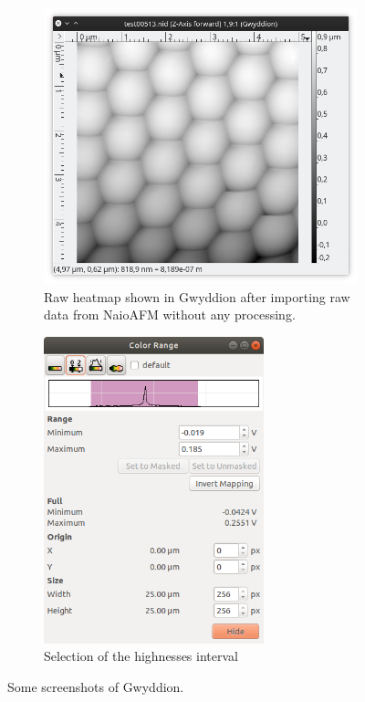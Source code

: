 \documentclass[11pt,a4paper]{article}
\begin{document}
\begin{figure}[ht]
\centering
\begin{subfigure}[b]{0.45\textwidth}
\includegraphics[width=\textwidth]{heatmap_rawdata}
\caption{Raw heatmap shown in Gwyddion after importing raw data from NaioAFM without any processing.}
\label{fig:heatmap_rawdata}
\end{subfigure}
\begin{subfigure}[b]{0.45\textwidth}
\centering
\includegraphics[width=0.7\textwidth]{scale_selection}
\caption{Selection of the highnesses interval}
\label{fig:scale_selection}
\end{subfigure}
\caption{Some screenshots of Gwyddion.}
\label{fig:gwyddion}
\end{figure}
\end{document}
